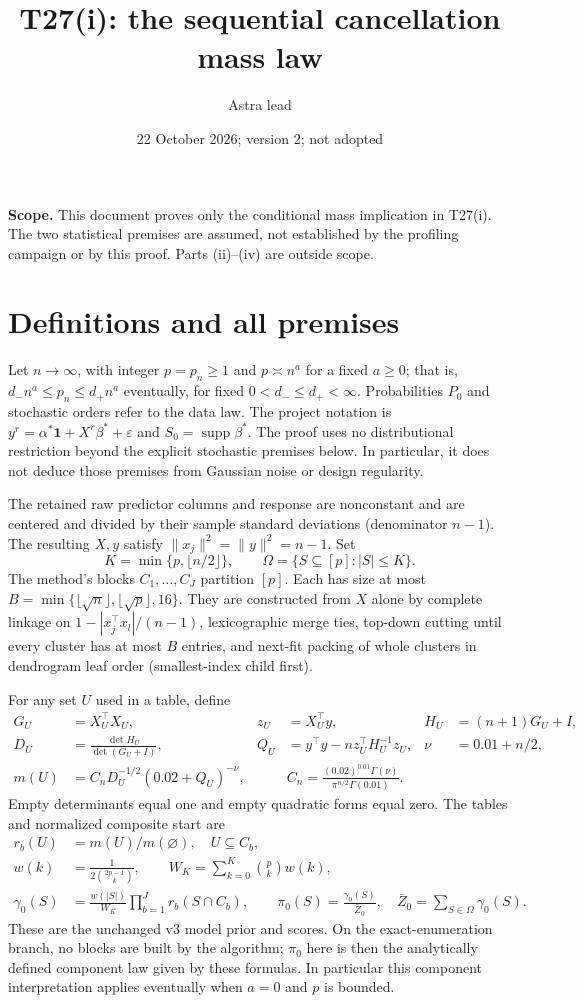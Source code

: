 ﻿\documentclass[11pt]{article}
\title{T27(i): the sequential cancellation mass law}
\author{Astra lead}
\date{22 October 2026; version 2; not adopted}
\newcommand{\emp}{\varnothing}
\begin{document}
\maketitle
\noindent\textbf{Scope.} This document proves only the conditional mass implication in T27(i). The two statistical premises are assumed, not established by the profiling campaign or by this proof. Parts (ii)--(iv) are outside scope.

\section{Definitions and all premises}
Let $n\to\infty$, with integer $p=p_n\ge1$ and $p\asymp n^a$ for a fixed $a\ge0$; that is, $d_-n^a\le p_n\le d_+n^a$ eventually, for fixed $0<d_-\le d_+<\infty$. Probabilities $P_0$ and stochastic orders refer to the data law. The project notation is $y^r=\alpha^*\mathbf1+X^r\beta^*+\varepsilon$ and $S_0=\operatorname{supp}\beta^*$. The proof uses no distributional restriction beyond the explicit stochastic premises below. In particular, it does not deduce those premises from Gaussian noise or design regularity.

The retained raw predictor columns and response are nonconstant and are centered and divided by their sample standard deviations (denominator $n-1$). The resulting $X,y$ satisfy $\|x_j\|^2=\|y\|^2=n-1$. Set
\[
 K=\min\{p,\lfloor n/2\rfloor\},\qquad
 \Omega=\{S\subseteq[p]:|S|\le K\}.
\]
The method's blocks $C_1,\ldots,C_J$ partition $[p]$. Each has size at most $B=\min\{\lfloor\sqrt n\rfloor,\lfloor\sqrt p\rfloor,16\}$. They are constructed from $X$ alone by complete linkage on $1-|x_j^\top x_l|/(n-1)$, lexicographic merge ties, top-down cutting until every cluster has at most $B$ entries, and next-fit packing of whole clusters in dendrogram leaf order (smallest-index child first).

For any set $U$ used in a table, define
\begin{align*}
 G_U&=X_U^\top X_U,& z_U&=X_U^\top y,& H_U&=(n+1)G_U+I,\\
 D_U&=\frac{\det H_U}{\det(G_U+I)},&
 Q_U&=y^\top y-nz_U^\top H_U^{-1}z_U,& \nu&=0.01+n/2,\\
 m(U)&=C_nD_U^{-1/2}(0.02+Q_U)^{-\nu},&&
 C_n=\frac{(0.02)^{0.01}\Gamma(\nu)}{\pi^{n/2}\Gamma(0.01)}.
\end{align*}
Empty determinants equal one and empty quadratic forms equal zero. The tables and normalized composite start are
\begin{align}
 r_b(U)&=m(U)/m(\emp),\quad U\subseteq C_b,\label{eq:table}\\
 w(k)&=\frac1{2\binom{2p-1}{k}},\qquad W_K=\sum_{k=0}^{K}\binom pk w(k),\nonumber\\
 \gamma_0(S)&=\frac{w(|S|)}{W_K}\prod_{b=1}^J r_b(S\cap C_b),\qquad
 \pi_0(S)=\frac{\gamma_0(S)}{\bar Z_0},\quad
 \bar Z_0=\sum_{S\in\Omega}\gamma_0(S).\label{eq:start}
\end{align}
These are the unchanged v3 model prior and scores. On the exact-enumeration branch, no blocks are built by the algorithm; $\pi_0$ here is then the analytically defined component law given by these formulas. In particular this component interpretation applies eventually when $a=0$ and $p$ is bounded.
\end{document}
